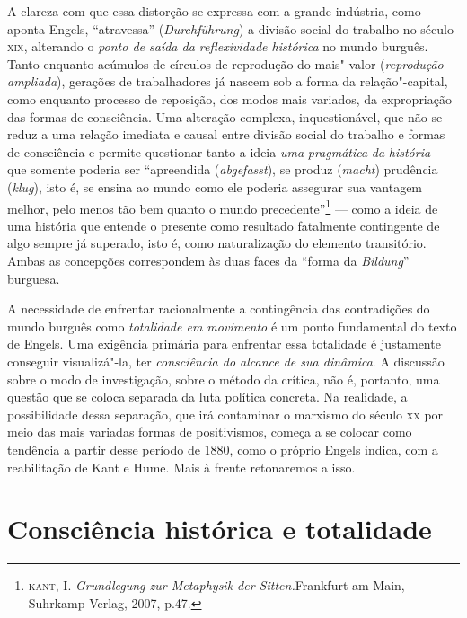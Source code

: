 A clareza com que essa distorção se expressa com a grande indústria,
como aponta Engels, ``atravessa'' (\emph{Durchführung}) a divisão social
do trabalho no século \textsc{xix}, alterando o \emph{ponto de saída da
reflexividade histórica} no mundo burguês. Tanto enquanto acúmulos de
círculos de reprodução do mais"-valor (\emph{reprodução ampliada}),
gerações de trabalhadores já nascem sob a forma da relação"-capital,
como enquanto processo de reposição, dos modos mais variados, da
expropriação das formas de consciência. Uma alteração complexa,
inquestionável, que não se reduz a uma relação imediata e causal entre
divisão social do trabalho e formas de consciência e permite questionar
tanto a ideia \emph{uma} \emph{pragmática} \emph{da} \emph{história} ---
que somente poderia ser ``apreendida (\emph{abgefasst}), se produz
(\emph{macht}) prudência (\emph{klug}), isto é, se ensina ao mundo como
ele poderia assegurar sua vantagem melhor, pelo menos tão bem quanto o
mundo precedente''\footnote{\textsc{kant}, I. \emph{Grundlegung zur
  Metaphysik der Sitten.}Frankfurt am Main, Suhrkamp Verlag, 2007, p.47.}
--- como a ideia de uma história que entende o presente como resultado
fatalmente contingente de algo sempre já superado, isto é, como
naturalização do elemento transitório. Ambas as concepções correspondem
às duas faces da ``forma da \emph{Bildung}'' burguesa.

A necessidade de enfrentar racionalmente a contingência das contradições
do mundo burguês como \emph{totalidade em movimento} é um ponto
fundamental do texto de Engels. Uma exigência primária para enfrentar
essa totalidade é justamente conseguir visualizá"-la, ter
\emph{consciência do alcance de sua dinâmica}. A discussão sobre o modo
de investigação, sobre o método da crítica, não é, portanto, uma questão
que se coloca separada da luta política concreta. Na realidade, a
possibilidade dessa separação, que irá contaminar o marxismo do século
\textsc{xx} por meio das mais variadas formas de positivismos, começa a
se colocar como tendência a partir desse período de 1880, como o próprio
Engels indica, com a reabilitação de Kant e Hume. Mais à frente
retonaremos a isso.

\section*{Consciência histórica e totalidade}


